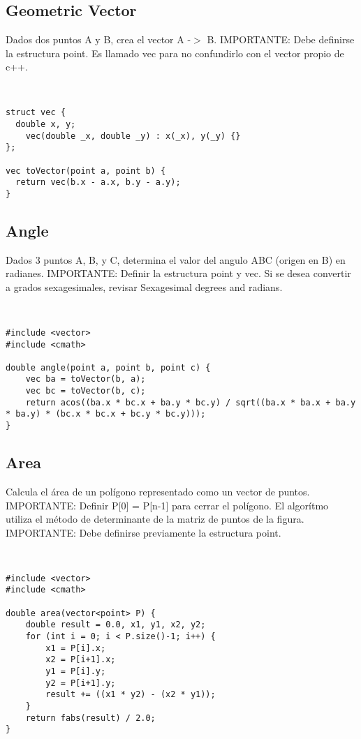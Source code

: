 \documentclass[11pt,letterpaper,twocolumn,twosided]{article}
\begin{document}
\subsection{Geometric Vector}
Dados dos puntos A y B, crea el vector A -$>$ B. IMPORTANTE: Debe definirse la estructura point. Es llamado vec para no confundirlo con el vector propio de c++.
\begin{lstlisting}


struct vec { 
  double x, y;  
    vec(double _x, double _y) : x(_x), y(_y) {} 
};

vec toVector(point a, point b) {       
  return vec(b.x - a.x, b.y - a.y); 
}
\end{lstlisting}


\subsection{Angle}
Dados 3 puntos A, B, y C, determina el valor del angulo ABC (origen en B) en radianes. IMPORTANTE: Definir la estructura point y vec. Si se desea convertir a grados sexagesimales, revisar Sexagesimal degrees and radians.
\begin{lstlisting}


#include <vector>
#include <cmath>

double angle(point a, point b, point c) { 
  	vec ba = toVector(b, a);
  	vec bc = toVector(b, c);
  	return acos((ba.x * bc.x + ba.y * bc.y) / sqrt((ba.x * ba.x + ba.y * ba.y) * (bc.x * bc.x + bc.y * bc.y))); 
}
\end{lstlisting}

\subsection{Area}
Calcula el \'area de un pol\'igono representado como un vector de puntos. IMPORTANTE: Definir P[0] = P[n-1] para cerrar el pol\'igono. El algor\'itmo utiliza el m\'etodo de determinante de la matriz de puntos de la figura. IMPORTANTE: Debe definirse previamente la estructura point.
\begin{lstlisting}


#include <vector>
#include <cmath>

double area(vector<point> P) {
	double result = 0.0, x1, y1, x2, y2;
  	for (int i = 0; i < P.size()-1; i++) {
    	x1 = P[i].x; 
    	x2 = P[i+1].x;
    	y1 = P[i].y; 
    	y2 = P[i+1].y;
    	result += ((x1 * y2) - (x2 * y1));
  	}
  	return fabs(result) / 2.0; 
}
\end{lstlisting}
\end{document}
